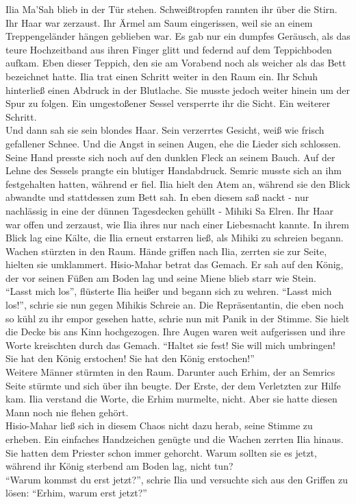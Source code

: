 Ilia Ma'Sah blieb in der Tür stehen. Schweißtropfen rannten ihr über die Stirn. Ihr Haar war 
zerzaust. Ihr Ärmel am Saum eingerissen, weil sie an einem Treppengeländer hängen geblieben war. Es 
gab nur ein dumpfes Geräusch, als das teure Hochzeitband aus ihren Finger glitt und federnd auf 
dem Teppichboden aufkam. Eben dieser Teppich, den sie am Vorabend noch als weicher als das Bett 
bezeichnet hatte. Ilia trat einen Schritt weiter in den Raum ein. Ihr Schuh hinterließ einen 
Abdruck in der Blutlache. Sie musste jedoch weiter hinein um der Spur zu folgen. Ein umgestoßener 
Sessel versperrte ihr die Sicht. Ein weiterer Schritt.\\
Und dann sah sie sein blondes Haar. Sein verzerrtes Gesicht, weiß wie frisch gefallener Schnee. Und 
die Angst in seinen Augen, ehe die Lieder sich schlossen. Seine Hand presste sich noch auf den 
dunklen Fleck an seinem Bauch. Auf der Lehne des Sessels prangte ein blutiger Handabdruck. Semric 
musste sich an ihm festgehalten hatten, während er fiel. Ilia hielt den Atem an, während sie den 
Blick abwandte und stattdessen zum Bett sah. In eben diesem saß nackt - nur nachlässig in eine der 
dünnen Tagesdecken gehüllt - Mihiki Sa Elren. Ihr Haar war offen und zerzaust, wie Ilia ihres nur 
nach einer Liebesnacht kannte. In ihrem Blick lag eine Kälte, die Ilia erneut erstarren ließ, als 
Mihiki zu schreien begann.\\
Wachen stürzten in den Raum. Hände griffen nach Ilia, zerrten sie zur Seite, hielten sie 
umklammert. Hisio-Mahar betrat das Gemach. Er sah auf den König, der vor seinen Füßen am Boden lag 
und seine Miene blieb starr wie Stein.\\
``Lasst mich los'', flüsterte Ilia heißer und begann sich zu wehren. ``Lasst mich los!'', schrie 
sie nun gegen Mihikis Schreie an. Die Repräsentantin, die eben noch so kühl zu ihr empor gesehen 
hatte, schrie nun mit Panik in der Stimme. Sie hielt die Decke bis ans Kinn hochgezogen. Ihre Augen 
waren weit aufgerissen und ihre Worte kreischten durch das Gemach. ``Haltet sie fest! Sie will mich umbringen! Sie hat den König erstochen! Sie hat den König erstochen!''\\
Weitere Männer stürmten in den Raum. Darunter auch Erhim, der an Semrics Seite stürmte und sich 
über ihn beugte. Der Erste, der dem Verletzten zur Hilfe kam. Ilia verstand die Worte, die Erhim 
murmelte, nicht. Aber sie hatte diesen Mann noch nie flehen gehört.\\
Hisio-Mahar ließ sich in diesem Chaos nicht dazu herab, seine Stimme zu erheben. Ein einfaches 
Handzeichen genügte und die Wachen zerrten Ilia hinaus. Sie hatten dem Priester schon immer 
gehorcht. Warum sollten sie es jetzt, während ihr König sterbend am Boden lag, nicht tun?\\
``Warum kommst du erst jetzt?'', schrie Ilia und versuchte sich aus den Griffen zu lösen: 
``Erhim, warum erst jetzt?''\\

